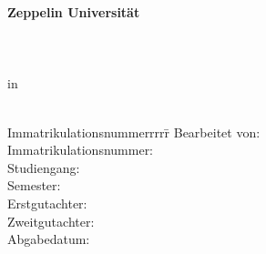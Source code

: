 \begin{centering}
\Large \textbf{Zeppelin Universität}\\
\Large \Chair \\
\vfill
\LARGE \textbf{\Title} \\
\vfill
\LARGE \Degree\\ 
\Large in \\
\LARGE \Programme\\
\vfill
\begin{small}
\begin{doublespace}
	\begin{tabbing}
	Immatrikulationsnummerrrrr\=\kill
	Bearbeitet von:\>\Name\\
	Immatrikulationsnummer:\>\MatrikelNummer\\
	Studiengang:\>\Programme\\
	Semester:\>\Semester\\
	Erstgutachter:\>\Supervisor\\
	Zweitgutachter:\>\Pruefer\\
	Abgabedatum:\>\Date
	\end{tabbing}
\end{doublespace}
\end{small}

\end{centering}\vspace{1cm}